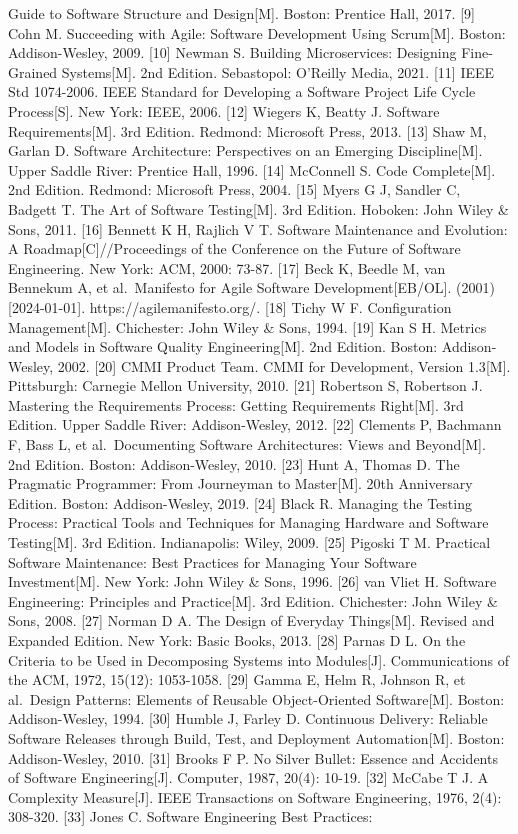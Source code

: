 {{Guide to Software Structure and Design{[}M{]}. Boston: Prentice Hall, 2017. {[}9{]} Cohn M. Succeeding with Agile: Software Development Using Scrum{[}M{]}. Boston: Addison-Wesley, 2009. {[}10{]} Newman S. Building Microservices: Designing Fine-Grained Systems{[}M{]}. 2nd Edition. Sebastopol: O'Reilly Media, 2021. {[}11{]} IEEE Std 1074-2006. IEEE Standard for Developing a Software Project Life Cycle Process{[}S{]}. New York: IEEE, 2006. {[}12{]} Wiegers K, Beatty J. Software Requirements{[}M{]}. 3rd Edition. Redmond: Microsoft Press, 2013. {[}13{]} Shaw M, Garlan D. Software Architecture: Perspectives on an Emerging Discipline{[}M{]}. Upper Saddle River: Prentice Hall, 1996. {[}14{]} McConnell S. Code Complete{[}M{]}. 2nd Edition. Redmond: Microsoft Press, 2004. {[}15{]} Myers G J, Sandler C, Badgett T. The Art of Software Testing{[}M{]}. 3rd Edition. Hoboken: John Wiley \& Sons, 2011. {[}16{]} Bennett K H, Rajlich V T. Software Maintenance and Evolution: A Roadmap{[}C{]}//Proceedings of the Conference on the Future of Software Engineering. New York: ACM, 2000: 73-87. {[}17{]} Beck K, Beedle M, van Bennekum A, et al.~Manifesto for Agile Software Development{[}EB/OL{]}. (2001){[}2024-01-01{]}. https://agilemanifesto.org/. {[}18{]} Tichy W F. Configuration Management{[}M{]}. Chichester: John Wiley \& Sons, 1994. {[}19{]} Kan S H. Metrics and Models in Software Quality Engineering{[}M{]}. 2nd Edition. Boston: Addison-Wesley, 2002. {[}20{]} CMMI Product Team. CMMI for Development, Version 1.3{[}M{]}. Pittsburgh: Carnegie Mellon University, 2010. {[}21{]} Robertson S, Robertson J. Mastering the Requirements Process: Getting Requirements Right{[}M{]}. 3rd Edition. Upper Saddle River: Addison-Wesley, 2012. {[}22{]} Clements P, Bachmann F, Bass L, et al.~Documenting Software Architectures: Views and Beyond{[}M{]}. 2nd Edition. Boston: Addison-Wesley, 2010. {[}23{]} Hunt A, Thomas D. The Pragmatic Programmer: From Journeyman to Master{[}M{]}. 20th Anniversary Edition. Boston: Addison-Wesley, 2019. {[}24{]} Black R. Managing the Testing Process: Practical Tools and Techniques for Managing Hardware and Software Testing{[}M{]}. 3rd Edition. Indianapolis: Wiley, 2009. {[}25{]} Pigoski T M. Practical Software Maintenance: Best Practices for Managing Your Software Investment{[}M{]}. New York: John Wiley \& Sons, 1996. {[}26{]} van Vliet H. Software Engineering: Principles and Practice{[}M{]}. 3rd Edition. Chichester: John Wiley \& Sons, 2008. {[}27{]} Norman D A. The Design of Everyday Things{[}M{]}. Revised and Expanded Edition. New York: Basic Books, 2013. {[}28{]} Parnas D L. On the Criteria to be Used in Decomposing Systems into Modules{[}J{]}. Communications of the ACM, 1972, 15(12): 1053-1058. {[}29{]} Gamma E, Helm R, Johnson R, et al.~Design Patterns: Elements of Reusable Object-Oriented Software{[}M{]}. Boston: Addison-Wesley, 1994. {[}30{]} Humble J, Farley D. Continuous Delivery: Reliable Software Releases through Build, Test, and Deployment Automation{[}M{]}. Boston: Addison-Wesley, 2010. {[}31{]} Brooks F P. No Silver Bullet: Essence and Accidents of Software Engineering{[}J{]}. Computer, 1987, 20(4): 10-19. {[}32{]} McCabe T J. A Complexity Measure{[}J{]}. IEEE Transactions on Software Engineering, 1976, 2(4): 308-320. {[}33{]} Jones C. Software Engineering Best Practices: }}
